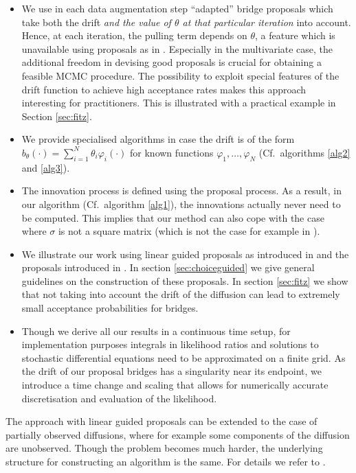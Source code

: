 \documentclass[preprint]{imsart}
\newcommand{\si}{\sigma}
\renewcommand{\th}{\theta}
\renewcommand{\phi}{\varphi}
\theoremstyle{definition}
\begin{document}
\begin{itemize}
\item We use in each data augmentation step ``adapted'' bridge proposals which take both the drift {\it and the value of $\th$ at that particular iteration} into account. Hence, at each iteration, the pulling term depends on $\th$, a feature which is unavailable using proposals as in \cite{DelyonHu}. Especially in the multivariate case, the additional freedom in devising good proposals is crucial for obtaining a feasible MCMC procedure. The possibility to exploit special features of the drift function to achieve high acceptance rates makes this approach interesting for practitioners. This is illustrated with a practical example in Section \ref{sec:fitz}. 

\item We provide specialised algorithms in case the drift is of the form $b_\th(\cdot)=\sum_{i=1}^N \th_i \phi_i(\cdot)$ for known functions $\phi_1,\ldots, \phi_N$ (Cf.\ algorithms \ref{alg2} and \ref{alg3}). 


\item The innovation process is defined using the proposal process. As a result, in our algorithm (Cf.\ algorithm \ref{alg1}),   the innovations actually never need to be computed. This implies that our method can also cope with the case where $\si$ is not a square matrix (which is not the case for example in \cite{Fuchs}).  

\item We illustrate our work using  linear guided proposals as introduced in \cite{Schauer} and the proposals introduced in \cite{DelyonHu}.  In section \ref{sec:choiceguided} we give general guidelines on the construction of these proposals. In section \ref{sec:fitz} we show that not taking into account the drift of the diffusion can lead to extremely small acceptance probabilities for bridges. 



\item 
Though we derive all our results in a continuous time setup, for implementation purposes integrals in likelihood ratios and solutions to stochastic differential equations  need to be approximated on a finite grid. 
As the drift of our proposal bridges  has a singularity near its endpoint, we introduce a time change and scaling that allows for numerically accurate discretisation and evaluation of the likelihood.
\end{itemize}

The approach with linear guided proposals can be extended to the case of partially observed diffusions, where for example some components of the diffusion are unobserved. Though the problem becomes much harder, the underlying structure for constructing an algorithm is the same. For details we refer to \cite{vdm-schauer}.
\end{document}
